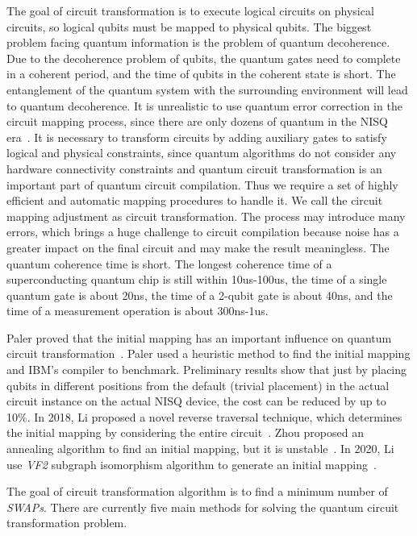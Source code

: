 \documentclass[runningheads]{llncs}
\begin{document}
The goal of circuit transformation is to execute logical circuits on physical circuits, so logical qubits must be mapped to physical qubits. The biggest problem facing quantum information is the problem of quantum decoherence. Due to the decoherence problem of qubits, the quantum gates need to complete in a coherent period, and the time of qubits in the coherent state is short. The entanglement of the quantum system with the surrounding environment will lead to quantum decoherence. It is unrealistic to use quantum error correction in the circuit mapping process, since there are only dozens of quantum in the NISQ era~\cite{2018QuantumPreskill}. It is necessary to transform circuits by adding auxiliary gates to satisfy logical and physical constraints, since quantum algorithms do not consider any hardware connectivity constraints and quantum circuit transformation is an important part of quantum circuit compilation. Thus we require a set of highly efficient and automatic mapping procedures to handle it. We call the circuit mapping adjustment as circuit transformation. The process may introduce many errors, which brings a huge challenge to circuit compilation because noise has a greater impact on the final circuit and may make the result meaningless. The quantum coherence time is short. The longest coherence time of a superconducting quantum chip is still within 10us-100us, the time of a single quantum gate is about 20ns, the time of a 2-qubit gate is about 40ns, and the time of a measurement operation is about 300ns-1us. 

Paler proved that the initial mapping has an important influence on quantum circuit transformation~\cite{Paler2018}. Paler used a heuristic method to find the initial mapping and IBM's compiler to benchmark. Preliminary results show that just by placing qubits in different positions from the default (trivial placement) in the actual circuit instance on the actual NISQ device, the cost can be reduced by up to 10\%. In 2018, Li proposed a novel reverse traversal technique, which determines the initial mapping by considering the entire circuit~\cite{Li2018}. Zhou proposed an annealing algorithm to find an initial mapping, but it is unstable~\cite{Xiangzhen2020}. In 2020, Li use \textit{VF2} subgraph isomorphism algorithm to generate an initial mapping~\cite{2020Qubit}.

The goal of circuit transformation algorithm is to find a minimum number of \textit{SWAPs}. There are currently five main methods for solving the quantum circuit transformation problem.
\end{document}
